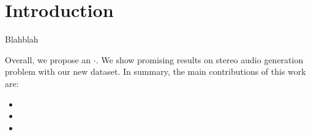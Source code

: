 \section{Introduction}
\label{sec:intro}

Blahblah

Overall, we propose an $\cdot$. We show promising results on stereo audio generation problem with our new dataset. In summary, the main contributions of this work are:
\begin{itemize}
    \item 
    \item 
    \item 
\end{itemize}
\fi